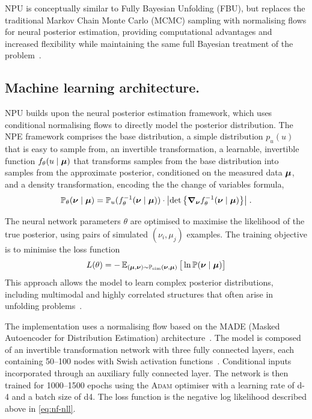     NPU is conceptually similar to Fully Bayesian Unfolding (FBU), but replaces the traditional Markov Chain Monte Carlo (MCMC) sampling with normalising flows for neural posterior estimation, providing computational advantages and increased flexibility while maintaining the same full Bayesian treatment of the problem~\cite{Rezende2015VariationalFlows}.
\subsection{Machine learning architecture.}
    NPU builds upon the neural posterior estimation framework, which uses conditional normalising flows to directly model the posterior distribution.
    The NPE framework comprises the base distribution, a simple distribution $p_u(u)$ that is easy to sample from,
    an invertible transformation, a learnable, invertible function $f_\theta(u\mid\vb*\mu)$ that transforms samples from the base distribution into samples from the approximate posterior, conditioned on the measured data $\vb*\mu$, and
    a density transformation, encoding the the change of variables formula,
    \[
        \mathbb{P}_\theta(\vb*\nu\mid\vb*\mu) = \mathbb{P}_u(f_\theta^{-1}(\vb*\nu\mid\vb*\mu))\cdot \qty|\det\qty{ \grad_{\vb*\nu}f_\theta^{-1}(\vb*\nu\mid\vb*\mu)}|\;.
    \]
    
    The neural network parameters $\theta$ are optimised to maximise the likelihood of the true posterior, using pairs of simulated $(\nu_i, \mu_j)$ examples.
    The training objective is to minimise the loss function
    \[
        \label{eq:nf-nll}
        L(\theta) = -\operatorname{\mathbb{E}}_{(\vb*\mu,\vb*\nu) \sim \mathbb{P}_{\text{sim}}(\vb*\nu, \vb*\mu)} \big[ \ln \mathbb{P} (\vb*\nu\mid\vb*\mu)\big]
    \]
    This approach allows the model to learn complex posterior distributions, including multimodal and highly correlated structures that often arise in unfolding problems~\cite{Papamakarios2016FastEstimation}.

    The implementation uses a normalising flow based on the MADE (Masked Autoencoder for Distribution Estimation) architecture~\cite{papamakarios_masked_2018}.
    The model is composed of an invertible transformation network with three fully connected layers, each containing \numrange{50}{100} nodes with Swish activation functions~\cite{Ramachandran2017SearchingFunctions}.
    Conditional inputs incorporated through an auxiliary fully connected layer.
    The network is then trained for \numrange{1000}{1500} epochs using the \textsc{Adam} optimiser with a learning rate of \num{d-4} and a batch size of \num{d4}.
    The loss function is the negative log likelihood described above in \cref{eq:nf-nll}.
    
